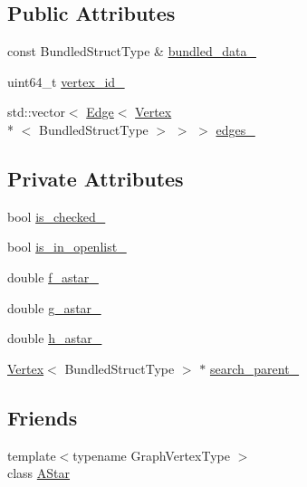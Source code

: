 \subsection*{Public Attributes}
\begin{DoxyCompactItemize}
\item 
const Bundled\-Struct\-Type \& \hyperlink{classsrcl__ctrl_1_1Vertex_a94c4a1e06c0f4f013c01cb1bc9153b07}{bundled\-\_\-data\-\_\-}
\item 
uint64\-\_\-t \hyperlink{classsrcl__ctrl_1_1Vertex_abed4bbf25b9b223c24bc2e3a1cc2016a}{vertex\-\_\-id\-\_\-}
\item 
std\-::vector$<$ \hyperlink{classsrcl__ctrl_1_1Edge}{Edge}$<$ \hyperlink{classsrcl__ctrl_1_1Vertex}{Vertex}\\*
$<$ Bundled\-Struct\-Type $>$ $>$ $>$ \hyperlink{classsrcl__ctrl_1_1Vertex_a932e06c0aecac6ab2cee0f428046fedd}{edges\-\_\-}
\end{DoxyCompactItemize}
\subsection*{Private Attributes}
\begin{DoxyCompactItemize}
\item 
bool \hyperlink{classsrcl__ctrl_1_1Vertex_a60a360ecaa196e365fca057dedc7a7f6}{is\-\_\-checked\-\_\-}
\item 
bool \hyperlink{classsrcl__ctrl_1_1Vertex_a5bafa9abce6e1bd65c6aa64094206f85}{is\-\_\-in\-\_\-openlist\-\_\-}
\item 
double \hyperlink{classsrcl__ctrl_1_1Vertex_ac43b465da0d5ecafce11cff22b1b5633}{f\-\_\-astar\-\_\-}
\item 
double \hyperlink{classsrcl__ctrl_1_1Vertex_a85d7b5498874822960ab30d6d3df3c60}{g\-\_\-astar\-\_\-}
\item 
double \hyperlink{classsrcl__ctrl_1_1Vertex_a83ac6cbf1e6c85477c1a4a05e1364811}{h\-\_\-astar\-\_\-}
\item 
\hyperlink{classsrcl__ctrl_1_1Vertex}{Vertex}$<$ Bundled\-Struct\-Type $>$ $\ast$ \hyperlink{classsrcl__ctrl_1_1Vertex_aab0a6786367f2e364b31cd1154fbdba2}{search\-\_\-parent\-\_\-}
\end{DoxyCompactItemize}
\subsection*{Friends}
\begin{DoxyCompactItemize}
\item 
{\footnotesize template$<$typename Graph\-Vertex\-Type $>$ }\\class \hyperlink{classsrcl__ctrl_1_1Vertex_a1c1aa353d37668bc4c0e2ba34d1482ca}{A\-Star}
\end{DoxyCompactItemize}


